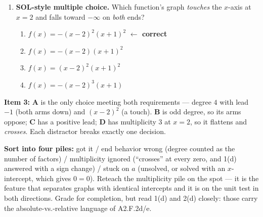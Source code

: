 \documentclass[10pt]{article}
\begin{document}
\begin{enumerate}[leftmargin=1.8em, itemsep=10pt]
    \vspace{2pt}
    (a) $x$-intercepts:  \; Which is a touch?  \;
    $y$-intercept: 

    \vspace{3pt}
    (b) Skeleton: $f(x) = a\,($$)($$)^2$ \quad Solve for $a$:
    $a = $ 

    \vspace{3pt}
    (c) A possible equation: 

    \vspace{3pt}
    (d) Does this function have an absolute maximum?  \; Explain in one sentence.

  \item \textbf{SOL-style multiple choice.} Which function's graph \emph{touches} the $x$-axis at
    $x=2$ and falls toward $-\infty$ on \emph{both} ends?
    \begin{enumerate}[label=\Alph*., leftmargin=1.9em, itemsep=1pt]
      \item $f(x) = -(x-2)^2(x+1)^2$ \quad \textcolor{keyred}{\textbf{$\leftarrow$ correct}}
      \item $f(x) = -(x-2)(x+1)^2$
      \item $f(x) = (x-2)^2(x+1)^2$
      \item $f(x) = -(x-2)^3(x+1)$
    \end{enumerate}
\end{enumerate}

\begin{teachernote}
\textbf{Item 3:} \textbf{A} is the only choice meeting both requirements --- degree $4$ with lead
$-1$ (both arms down) and $(x-2)^2$ (a touch). \textbf{B} is odd degree, so its arms oppose;
\textbf{C} has a positive lead; \textbf{D} has multiplicity $3$ at $x=2$, so it flattens and
\emph{crosses}. Each distractor breaks exactly one decision.

\vspace{3pt}
\textbf{Sort into four piles:} got it / end behavior wrong (degree counted as the number of factors)
/ multiplicity ignored (``crosses'' at every zero, and 1(d) answered with a sign change) / stuck on
$a$ (unsolved, or solved with an $x$-intercept, which gives $0=0$). Reteach the multiplicity pile on
the spot --- it is the feature that separates graphs with identical intercepts and it is on the unit
test in both directions. Grade for completion, but read 1(d) and 2(d) closely: those carry the
absolute-vs.-relative language of A2.F.2d/e.
\end{teachernote}
\end{document}
